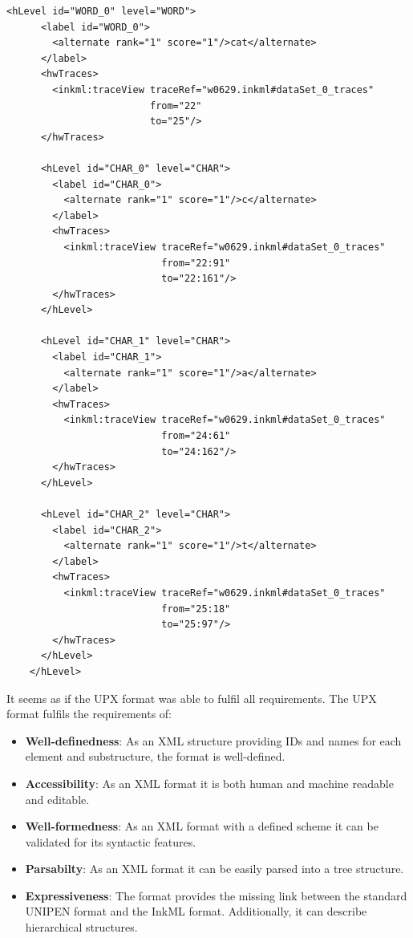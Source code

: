 \begin{xmlcode}
  \begin{lstlisting}[emph={hLevel,hwTraces},
                     emphstyle={\color{blue}\textbf},
                     emph={[2]id,level},
                     emphstyle={[2]\color{red}},
                     caption={Demonstration of the \emph{hLevel} tag in UPX},
                     label=lst:hLevelinupx]
    <hLevel id="WORD_0" level="WORD">
      <label id="WORD_0">
        <alternate rank="1" score="1"/>cat</alternate>
      </label>
      <hwTraces> 
        <inkml:traceView traceRef="w0629.inkml#dataSet_0_traces" 
                         from="22" 
                         to="25"/>
      </hwTraces>

      <hLevel id="CHAR_0" level="CHAR">
        <label id="CHAR_0">
          <alternate rank="1" score="1"/>c</alternate>
        </label>
        <hwTraces> 
          <inkml:traceView traceRef="w0629.inkml#dataSet_0_traces" 
                           from="22:91" 
                           to="22:161"/>
        </hwTraces>
      </hLevel>

      <hLevel id="CHAR_1" level="CHAR">
        <label id="CHAR_1">
          <alternate rank="1" score="1"/>a</alternate>
        </label>
        <hwTraces> 
          <inkml:traceView traceRef="w0629.inkml#dataSet_0_traces" 
                           from="24:61" 
                           to="24:162"/>
        </hwTraces>
      </hLevel>

      <hLevel id="CHAR_2" level="CHAR">
        <label id="CHAR_2">
          <alternate rank="1" score="1"/>t</alternate>
        </label>
        <hwTraces> 
          <inkml:traceView traceRef="w0629.inkml#dataSet_0_traces" 
                           from="25:18" 
                           to="25:97"/>
        </hwTraces>
      </hLevel>
    </hLevel>
  \end{lstlisting}
\end{xmlcode}
It seems as if the UPX format was able to fulfil all requirements.
The UPX format fulfils the requirements of:
\begin{itemize}
  \item \textbf{Well-definedness}: As an XML structure providing IDs and names 
        for each element and substructure, the format is well-defined.

  \item \textbf{Accessibility}: As an XML format it is both human and machine
        readable and editable.

  \item \textbf{Well-formedness}: As an XML format with a defined scheme it can
        be validated for its syntactic features.

  \item \textbf{Parsabilty}: As an XML format it can be easily parsed into a
        tree structure.

  \item \textbf{Expressiveness}: The format provides the missing link between the
        standard UNIPEN format and the InkML format. Additionally, it can 
        describe hierarchical structures.
\end{itemize}
